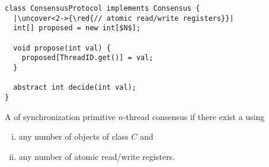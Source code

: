 \begin{frame}[fragile]{}
  \begin{lstlisting}[style = CStyle]
class ConsensusProtocol implements Consensus {
  |\uncover<2->{\red{// atomic read/write registers}}|
  int[] proposed = new int[$N$];  

  void propose(int val) {
    proposed[ThreadID.get()] = val;
  }

  abstract int decide(int val);
}
  \end{lstlisting}
\end{frame}

\begin{frame}{}
  \begin{definition}[``Solves''] 
    A  of synchronization primitive  $n$-thread consensus 
    if there exist a  using 

    \begin{enumerate}[(i)]
      \item any number of objects of class $C$ and
      \item any number of atomic read/write registers.
    \end{enumerate}
  \end{definition}
\end{frame}
